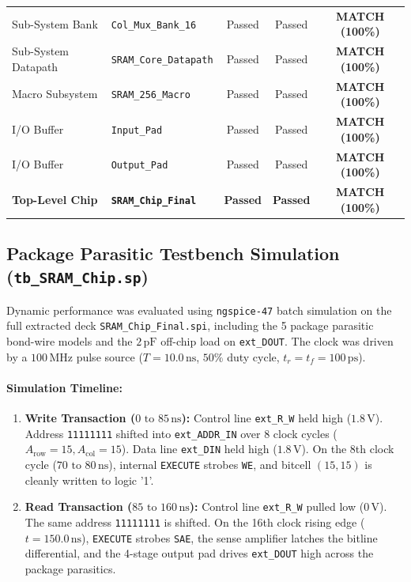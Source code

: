 \documentclass[10pt,a4paper,titlepage]{article}
\begin{document}
\begin{table}[h!]
\begin{tabularx}{0.95\textwidth}{llccc}
Sub-System Bank & \texttt{Col\_Mux\_Bank\_16} & Passed & Passed & \textcolor{emerald}{\textbf{MATCH (100\%)}} \\
Sub-System Datapath & \texttt{SRAM\_Core\_Datapath} & Passed & Passed & \textcolor{emerald}{\textbf{MATCH (100\%)}} \\
Macro Subsystem & \texttt{SRAM\_256\_Macro} & Passed & Passed & \textcolor{emerald}{\textbf{MATCH (100\%)}} \\
I/O Buffer & \texttt{Input\_Pad} & Passed & Passed & \textcolor{emerald}{\textbf{MATCH (100\%)}} \\
I/O Buffer & \texttt{Output\_Pad} & Passed & Passed & \textcolor{emerald}{\textbf{MATCH (100\%)}} \\
\textbf{Top-Level Chip} & \textbf{\texttt{SRAM\_Chip\_Final}} & \textbf{Passed} & \textbf{Passed} & \textcolor{emerald}{\textbf{MATCH (100\%)}} \\
\bottomrule
\end{tabularx}
\end{table}

\subsection{Package Parasitic Testbench Simulation (\texttt{tb\_SRAM\_Chip.sp})}
Dynamic performance was evaluated using \texttt{ngspice-47} batch simulation on the full extracted deck \texttt{SRAM\_Chip\_Final.spi}, including the 5 package parasitic bond-wire models and the $2\,\text{pF}$ off-chip load on \texttt{ext\_DOUT}. The clock was driven by a $100\,\text{MHz}$ pulse source ($T = 10.0\,\text{ns}$, $50\%$ duty cycle, $t_r = t_f = 100\,\text{ps}$).

\paragraph{Simulation Timeline:}
\begin{enumerate}[itemsep=2pt]
    \item \textbf{Write Transaction ($0\text{ to }85\,\text{ns}$):} Control line \texttt{ext\_R\_W} held high ($1.8\,\text{V}$). Address \texttt{11111111} shifted into \texttt{ext\_ADDR\_IN} over 8 clock cycles ($A_{\text{row}} = 15, A_{\text{col}} = 15$). Data line \texttt{ext\_DIN} held high ($1.8\,\text{V}$). On the 8th clock cycle ($70\text{ to }80\,\text{ns}$), internal \texttt{EXECUTE} strobes \texttt{WE}, and bitcell $(15, 15)$ is cleanly written to logic '1'.
    \item \textbf{Read Transaction ($85\text{ to }160\,\text{ns}$):} Control line \texttt{ext\_R\_W} pulled low ($0\,\text{V}$). The same address \texttt{11111111} is shifted. On the 16th clock rising edge ($t = 150.0\,\text{ns}$), \texttt{EXECUTE} strobes \texttt{SAE}, the sense amplifier latches the bitline differential, and the 4-stage output pad drives \texttt{ext\_DOUT} high across the package parasitics.
\end{enumerate}
\end{document}
